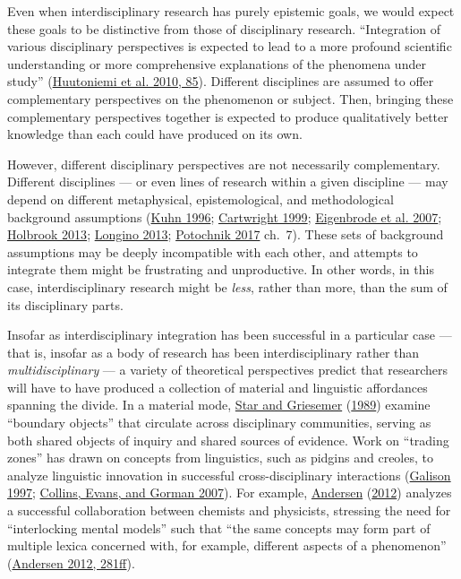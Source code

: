 \documentclass[
  11pt,
]{article}
\begin{document}
Even when interdisciplinary research has purely epistemic goals, we would expect these goals to be distinctive from those of disciplinary research. ``Integration of various disciplinary perspectives is expected to lead to a more profound scientific understanding or more comprehensive explanations of the phenomena under study'' (\protect\hyperlink{ref-HuutoniemiAnalyzingInterdisciplinarityTypology2010}{Huutoniemi et al. 2010, 85}). Different disciplines are assumed to offer complementary perspectives on the phenomenon or subject. Then, bringing these complementary perspectives together is expected to produce qualitatively better knowledge than each could have produced on its own.

However, different disciplinary perspectives are not necessarily complementary. Different disciplines --- or even lines of research within a given discipline --- may depend on different metaphysical, epistemological, and methodological background assumptions (\protect\hyperlink{ref-KuhnStructureScientificRevolutions1996}{Kuhn 1996}; \protect\hyperlink{ref-CartwrightDappledWorld1999}{Cartwright 1999}; \protect\hyperlink{ref-EigenbrodeEmployingPhilosophicalDialogue2007}{Eigenbrode et al. 2007}; \protect\hyperlink{ref-HolbrookWhatInterdisciplinaryCommunication2013}{Holbrook 2013}; \protect\hyperlink{ref-LonginoStudyingHumanBehavior2013}{Longino 2013}; \protect\hyperlink{ref-PotochnikIdealizationAimsScience2017}{Potochnik 2017} ch.~7). These sets of background assumptions may be deeply incompatible with each other, and attempts to integrate them might be frustrating and unproductive. In other words, in this case, interdisciplinary research might be \emph{less}, rather than more, than the sum of its disciplinary parts.

Insofar as interdisciplinary integration has been successful in a particular case --- that is, insofar as a body of research has been interdisciplinary rather than \emph{multidisciplinary} --- a variety of theoretical perspectives predict that researchers will have to have produced a collection of material and linguistic affordances spanning the divide. In a material mode, \protect\hyperlink{ref-StarInstitutionalEcologyTranslations1989}{Star and Griesemer} (\protect\hyperlink{ref-StarInstitutionalEcologyTranslations1989}{1989}) examine ``boundary objects'' that circulate across disciplinary communities, serving as both shared objects of inquiry and shared sources of evidence. Work on ``trading zones'' has drawn on concepts from linguistics, such as pidgins and creoles, to analyze linguistic innovation in successful cross-disciplinary interactions (\protect\hyperlink{ref-GalisonImageLogicMaterial1997}{Galison 1997}; \protect\hyperlink{ref-CollinsTradingZonesInteractional2007}{Collins, Evans, and Gorman 2007}). For example, \protect\hyperlink{ref-AndersenConceptualDevelopmentInterdisciplinary2012}{Andersen} (\protect\hyperlink{ref-AndersenConceptualDevelopmentInterdisciplinary2012}{2012}) analyzes a successful collaboration between chemists and physicists, stressing the need for ``interlocking mental models'' such that ``the same concepts may form part of multiple lexica concerned with, for example, different aspects of a phenomenon'' (\protect\hyperlink{ref-AndersenConceptualDevelopmentInterdisciplinary2012}{Andersen 2012, 281ff}).
\end{document}
